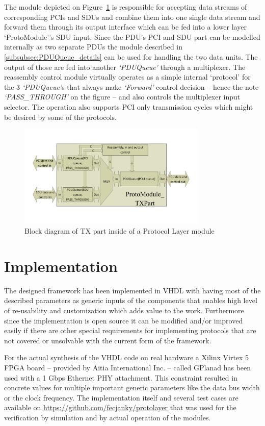 \documentclass[conference]{IEEEtran}
\begin{document}
The module depicted on Figure~\ref{fig:proto_layer_tx_sch} is responsible for accepting data streams of corresponding PCIs and SDUs and combine them into one single data stream and forward them through its output interface which can be fed into a lower layer `ProtoModule''s SDU input. Since the PDU's PCI and SDU part can be modelled internally as two separate PDUs the module described in \ref{subsubsec:PDUQueue_details} can be used for handling the two data units. The output of those are fed into another \emph{`PDUQueue'} through a multiplexer. The reassembly control module virtually operates as a simple internal `protocol' for the 3 \emph{`PDUQueue'}s that always make \emph{`Forward'} control decision -- hence the note \emph{`PASS\_THROUGH'} on the figure -- and also controls the multiplexer input selector. The operation also supports PCI only transmission cycles which might be desired by some of the protocols.
\begin{figure}[!htb]
    \centering
    \includegraphics[width=9cm]{figures_raw/proto_tx_part_imp.pdf}
    \caption{Block diagram of TX part inside of a Protocol Layer module}
    \label{fig:proto_layer_tx_sch}
\end{figure}

\section{Implementation}\label{sec:Implementation}

The designed framework has been implemented in VHDL with having most of the described parameters as generic inputs of the components that enables high level of re-usability and customization which adds value to the work. Furthermore since the implementation is open source it can be modified and/or improved easily if there are other special requirements for implementing protocols that are not covered or unsolvable with the current form of the framework. 

For the actual synthesis of the VHDL code on real hardware a Xilinx Virtex 5 FPGA board -- provided by Aitia International Inc. -- called GPlanad has been used with a 1 Gbps Ethernet PHY attachment. This constraint resulted in concrete values for multiple important generic parameters like the data bus width or the clock frequency. The implementation itself and several test cases are available on \url{https://github.com/fecjanky/protolayer} that was used for the verification by simulation and by actual operation of the modules.
\end{document}
